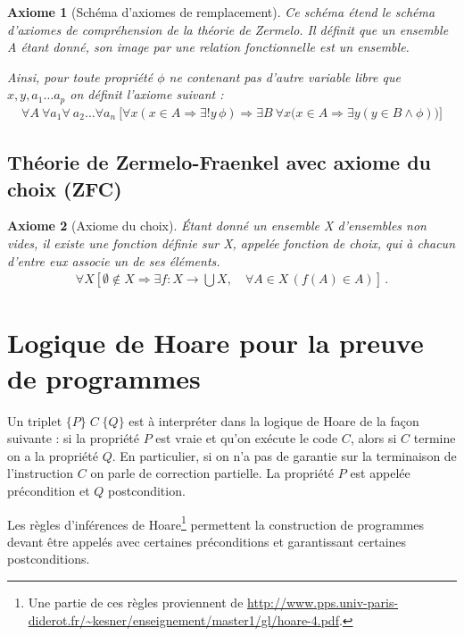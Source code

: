 \documentclass[10pt,a4paper]{article}
\newtheorem{axiom}{Axiome}[section]
\begin{document}
\begin{axiom}[Schéma d'axiomes de remplacement] Ce schéma étend le schéma d'axiomes de compréhension de la théorie de Zermelo. Il définit que un ensemble A étant donné, son image par une relation fonctionnelle est un ensemble.

Ainsi, pour toute propriété $\phi$ ne contenant pas d'autre variable libre que $x, y, a_1 \ldots a_p$ on définit l'axiome suivant :
\begin{align}
\forall A \ \forall a_1 \forall \ a_2 \ldots \forall a_n \ 
\bigl[ \forall x ( x\in A \Rightarrow \exists! y\,\phi ) \Rightarrow \exists B \ \forall x \bigl(x\in A \Rightarrow \exists y (y\in B \land \phi) \bigr) \bigr]
\end{align}
\end{axiom}

\subsection{Théorie de Zermelo-Fraenkel avec axiome du choix (ZFC)}

\begin{axiom}[Axiome du choix] Étant donné un ensemble X d'ensembles non vides, il existe une fonction définie sur X, appelée fonction de choix, qui à chacun d'entre eux associe un de ses éléments.
\begin{align}
\forall X \left[ \emptyset \notin X \Rightarrow \exists f: X \rightarrow \bigcup X, \quad \forall A \in X \, ( f(A) \in A ) \right] \,. 
\end{align}
\end{axiom}

\section{Logique de Hoare pour la preuve de programmes}

Un triplet $ \{P\}\;C\;\{Q\} $ est à interpréter dans la logique de Hoare de la façon suivante : si la propriété $P$ est vraie et qu'on exécute le code $C$, alors si $C$ termine on a la propriété $Q$. En particulier, si on n'a pas de garantie sur la terminaison de l'instruction $C$ on parle de correction partielle. La propriété $P$ est appelée précondition et $Q$ postcondition.

Les règles d'inférences de Hoare\footnote{Une partie de ces règles proviennent de \url{http://www.pps.univ-paris-diderot.fr/~kesner/enseignement/master1/gl/hoare-4.pdf}.} permettent la construction de programmes devant être appelés avec certaines préconditions et garantissant certaines postconditions.
\end{document}
